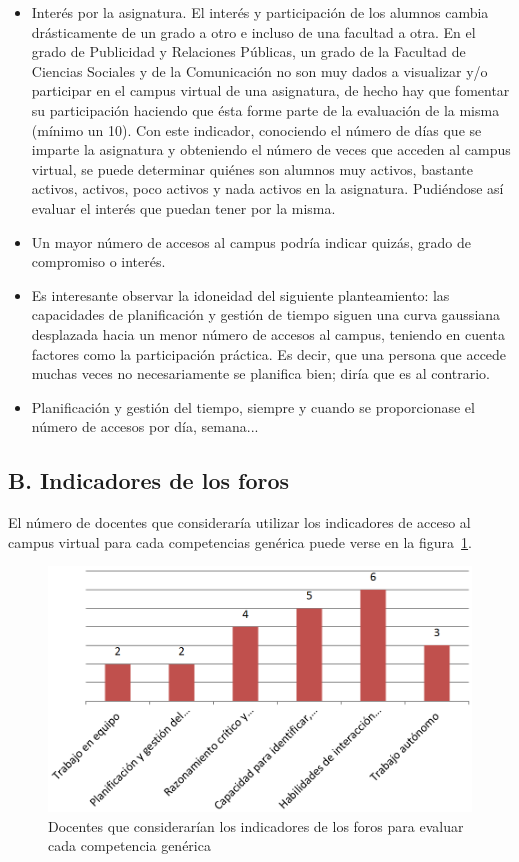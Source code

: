 \begin{itemize}
\item Interés por la asignatura. El interés y participación de los alumnos cambia drásticamente de un grado a otro e incluso de una facultad a otra. En el grado de Publicidad y Relaciones Públicas, un grado de la Facultad de Ciencias Sociales y de la Comunicación no son muy dados a visualizar y/o participar en el campus virtual de una asignatura, de hecho hay que fomentar su participación haciendo que ésta forme parte de la evaluación de la misma (mínimo un 10\percentage). Con este indicador, conociendo el número de días que se imparte la asignatura y obteniendo el número de veces que acceden al campus virtual, se puede determinar quiénes son alumnos muy activos, bastante activos, activos, poco activos y nada activos en la asignatura. Pudiéndose así evaluar el interés que puedan tener por la misma.
\item Un mayor número de accesos al campus podría indicar quizás, grado de compromiso o interés.
\item Es interesante observar la idoneidad del siguiente planteamiento: las capacidades de planificación y gestión de tiempo siguen una curva gaussiana desplazada hacia un menor número de accesos al campus, teniendo en cuenta factores como la participación práctica. Es decir, que una persona que accede muchas veces no necesariamente se planifica bien; diría que es al contrario.
\item Planificación y gestión del tiempo, siempre y cuando se proporcionase el número de accesos por día, semana...
\end{itemize}

	\subsection*{B. Indicadores de los foros}

El número de docentes que consideraría utilizar los indicadores de acceso al campus virtual para cada competencias genérica puede verse en la figura~\ref{fig:ape:aa:foros}.

\begin{figure}[h]
    \includegraphics[scale=0.4]{aa_foros.png}
  \caption{Docentes que considerarían los indicadores de los foros para evaluar cada competencia genérica}
  \label{fig:ape:aa:foros}
\end{figure}

